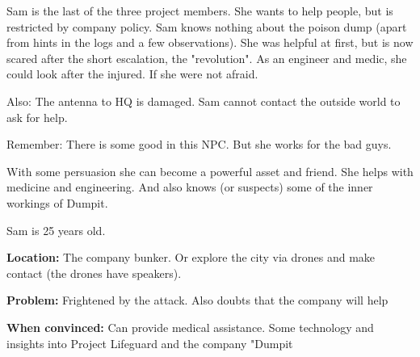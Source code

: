 \begin{npcBox}[title=Sam]
    \begin{consequences}
    \item {}
    \item {}
    \item {}
    \end{consequences}

    \begin{npcDescription}
    Sam is the last of the three project members. She wants to help people, but is restricted by company policy. Sam knows nothing about the poison dump (apart from hints in the logs and a few observations). She was helpful at first, but is now scared after the short escalation, the "revolution". As an engineer and medic, she could look after the injured. If she were not afraid.

    Also: The antenna to HQ is damaged. Sam cannot contact the outside world to ask for help.

    Remember: There is some good in this NPC. But she works for the bad guys.

    With some persuasion she can become a powerful asset and friend. She helps with medicine and engineering. And also knows (or suspects) some of the inner workings of Dumpit.

    Sam is 25 years old.

    \textbf{Location:} The company bunker. Or explore the city via drones and make contact (the drones have speakers).

    \textbf{Problem:} Frightened by the attack. Also doubts that the company will help

    \textbf{When convinced:} Can provide medical assistance. Some technology and insights into Project Lifeguard and the company "Dumpit
    \end{npcDescription}

\end{npcBox}

\newpage

